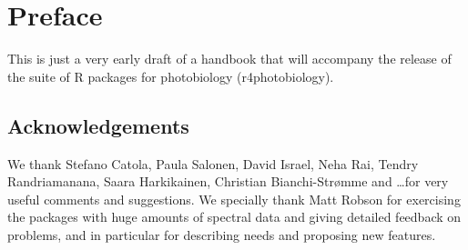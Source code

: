 \chapter{Preface}

This is just a very early draft of a handbook that will accompany the release of the suite of R packages for photobiology (\textsf{r4photobiology}).

\section{Acknowledgements}

We thank Stefano Catola, Paula Salonen, David Israel, Neha Rai, Tendry Randriamanana, Saara Harkikainen, Christian Bianchi-Str{\o}mme and \ldots for very useful comments and suggestions. We specially thank Matt Robson for exercising the packages with huge amounts of spectral data and giving detailed feedback on problems, and in particular for describing needs and proposing new features.
